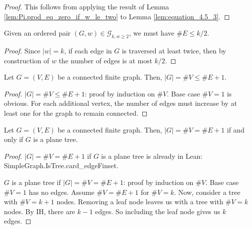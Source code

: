 \begin{proof}
  This follows from applying the result of Lemma \ref{lem:Pi.prod_eq_zero_if_w_le_two} to Lemma \ref{lem:equation_4.5_3}.
\end{proof}
\begin{lemma}
  \label{lem:edge_set_order_leq_k_over_two}
  Given an ordered pair $(G,w) \in \mathcal{G}_{k,w \geq 2}$, we must have $\# E \leq k/2$.
\end{lemma}
\begin{proof}
  Since $|w| = k$, if each edge in $G$ is traversed at least twice, then by construction of $w$ the number of edges is at most $k/2$.
\end{proof}







\begin{proposition}%
  \label{prop:vertex_edge_inequality}
  \notready
  Let $G=(V,E)$ be a connected finite graph. Then, $|G|=\#V\le \#E+1$.
\end{proposition}

\begin{proof}
  \notready
  $|G|= \#V\le \#E+1$: proof by induction on $\#V$. Base case $\#V = 1$ is obvious. For each additional vertex, the number of edges must increase by at least one for the graph to remain connected.
\end{proof}

\begin{proposition}
  \label{prop:vertex_edge_tree_equality}
  \notready
  Let $G=(V,E)$ be a connected finite graph. Then, $|G|=\#V=\#E+1$ if and only if $G$ is a plane tree.
\end{proposition}

\begin{proof}
  \notready
  $|G|=\#V=\#E+1$ if $G$ is a plane tree is already in Lean: SimpleGraph.IsTree.card\_edgeFinset.

  $G$ is a plane tree if $|G|=\#V=\#E+1$: proof by induction on $\#V$. Base case $\#V = 1$ has no edges. Assume $\#V = \#E + 1$ for $\#V = k$. Now, consider a tree with $\#V = k+1$ nodes. Removing a leaf node leaves us with a tree with $\#V = k$ nodes. By IH, there are $k - 1$ edges. So including the leaf node gives us $k$ edges.
\end{proof}


